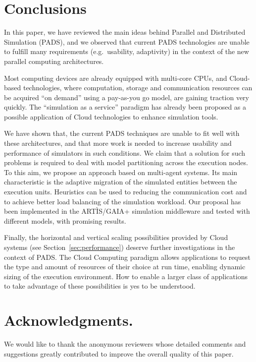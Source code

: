 \documentclass[1p]{elsarticle}
\begin{document}
\section{Conclusions}\label{sec:conc}

In this paper, we have reviewed the main ideas behind Parallel and
Distributed Simulation (PADS), and we observed that current PADS
technologies are unable to fulfill many requirements (e.g.~usability,
adaptivity) in the context of the new parallel computing architectures.

Most computing devices are already equipped with multi-core CPUs, and
Cloud-based technologies, where computation, storage and communication
resources can be acquired ``on demand'' using a pay-as-you go model,
are gaining traction very quickly. The ``simulation as a service''
paradigm has already been proposed as a possible application of Cloud
technologies to enhance simulation tools.

We have shown that, the current PADS techniques are unable to fit well
with these architectures, and that more work is needed to increase
usability and performance of simulators in such conditions. We claim
that a solution for such problems is required to deal with model
partitioning across the execution nodes. To this aim, we propose an
approach based on multi-agent systems. Its main characteristic is the
adaptive migration of the simulated entities between the execution
units. Heuristics can be used to reducing the communication cost and
to achieve better load balancing of the simulation workload. Our
proposal has been implemented in the ART\`IS/GAIA+ simulation
middleware and tested with different models, with promising results.

Finally, the horizontal and vertical scaling possibilities provided by
Cloud systems (see Section~\ref{sec:performance}) deserve further
investigations in the context of PADS. The Cloud Computing paradigm
allows applications to request the type and amount of resources of
their choice at run time, enabling dynamic sizing of the execution
environment. How to enable a larger class of applications to take
advantage of these possibilities is yes to be understood.

\section*{Acknowledgments.} 

We would like to thank the anonymous reviewers whose detailed comments
and suggestions greatly contributed to improve the overall quality of
this paper.
\end{document}
